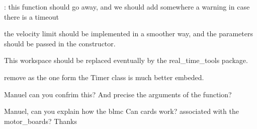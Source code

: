 
\begin{DoxyRefList}
\item[\label{todo__todo000003}%
\Hypertarget{todo__todo000003}%
Member \hyperlink{classblmc__drivers_1_1CanBusMotorBoard_a19ffd7d9ef9a441299164485e85ec6fd}{blmc\+\_\+drivers\+:\+:Can\+Bus\+Motor\+Board\+:\+:pause\+\_\+motors} ()]\+: this function should go away, and we should add somewhere a warning in case there is a timeout  
\item[\label{todo__todo000002}%
\Hypertarget{todo__todo000002}%
Class \hyperlink{classblmc__drivers_1_1SafeMotor}{blmc\+\_\+drivers\+:\+:Safe\+Motor} ]the velocity limit should be implemented in a smoother way, and the parameters should be passed in the constructor.  
\item[\label{todo__todo000004}%
\Hypertarget{todo__todo000004}%
Namespace \hyperlink{namespaceosi}{osi} ]This workspace should be replaced eventually by the real\+\_\+time\+\_\+tools package.  
\item[\label{todo__todo000006}%
\Hypertarget{todo__todo000006}%
Member \hyperlink{namespaceosi_a2409ab591c4f78d9a8bcfbbe38df9429}{osi\+:\+:get\+\_\+current\+\_\+time\+\_\+ms} ()]remove as the one form the Timer class is much better embeded. 
\item[\label{todo__todo000005}%
\Hypertarget{todo__todo000005}%
Member \hyperlink{namespaceosi_a244466c0afc9ae9fe059cee665fb0603}{osi\+:\+:receive\+\_\+message\+\_\+from\+\_\+can\+\_\+device} (int fd, struct msghdr $\ast$msg, int flags)]Manuel can you confrim this? And precise the arguments of the function? 
\item[\label{todo__todo000001}%
\Hypertarget{todo__todo000001}%
page \hyperlink{index}{This is the documentation of the blmc\+\_\+drivers package.} ]Manuel, can you explain how the blmc Can cards work? associated with the motor\+\_\+boards? Thanks
\end{DoxyRefList}